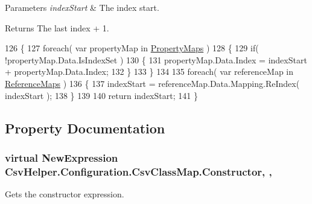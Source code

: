 \begin{DoxyParams}{Parameters}
{\em index\-Start} & The index start.\\
\hline
\end{DoxyParams}
\begin{DoxyReturn}{Returns}
The last index + 1.
\end{DoxyReturn}

\begin{DoxyCode}
126         \{
127             \textcolor{keywordflow}{foreach}( var propertyMap \textcolor{keywordflow}{in} \hyperlink{a00040_a9580e897abcba144f3101eb983348e25}{PropertyMaps} )
128             \{
129                 \textcolor{keywordflow}{if}( !propertyMap.Data.IsIndexSet )
130                 \{
131                     propertyMap.Data.Index = indexStart + propertyMap.Data.Index;
132                 \}
133             \}
134 
135             \textcolor{keywordflow}{foreach}( var referenceMap \textcolor{keywordflow}{in} \hyperlink{a00040_a6dfbf8f743b16d2ec83edef865ea2d9e}{ReferenceMaps} )
136             \{
137                 indexStart = referenceMap.Data.Mapping.ReIndex( indexStart );
138             \}
139 
140             \textcolor{keywordflow}{return} indexStart;
141         \}
\end{DoxyCode}


\subsection{Property Documentation}
\hypertarget{a00040_ae8038b36db7584ef1a73852fcc46404b}{
\subsubsection[{Constructor}]{\setlength{\rightskip}{0pt plus 5cm}virtual New\-Expression Csv\-Helper.\-Configuration.\-Csv\-Class\-Map.\-Constructor\hspace{0.3cm}{\ttfamily [get]}, {\ttfamily [set]}, {\ttfamily [inherited]}}}\label{a00040_ae8038b36db7584ef1a73852fcc46404b}


Gets the constructor expression. 


